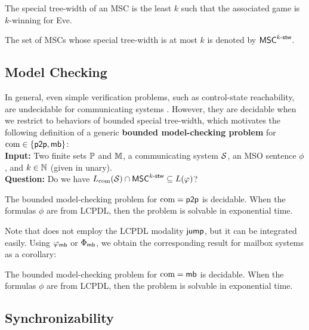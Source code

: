 \documentclass{article}
\begin{document}
\begin{fact}
	The special tree-width of an MSC is the least $k$ such that
	the associated game is $k$-winning for Eve.
\end{fact}

The set of MSCs whose special tree-width is at most $k$ is denoted by $\mathsf{MSC}^{k\textup{-}\mathsf{stw}}$.

\subsection{Model Checking}

In general, even simple verification problems, such
as control-state reachability, are undecidable for
communicating systems \cite{DBLP:journals/jacm/BrandZ83}.
However, they are decidable when we restrict to behaviors of
bounded special tree-width, which motivates the following
definition of a generic {\bf bounded model-checking problem} for $\textup{com} \in \{\mathsf{p2p}, \mathsf{mb}\}$:\\
%
{\bf Input:} Two finite sets $\mathbb{P}$ and $\mathbb{M}$, a communicating system $\mathcal{S}$, an MSO sentence $\phi$, and $k \in \mathbb{N}$ (given in unary).\\
%
{\bf Question:} Do we have $L_{\textup{com}}(\mathcal{S}) \cap \mathsf{MSC}^{k\textup{-}\mathsf{stw}} \subseteq L(\varphi)$?


\begin{fact}\label{p2p}
The bounded model-checking problem for $\textup{com} = \mathsf{p2p}$ is decidable.
When the formulas $\phi$ are from LCPDL, then the problem is solvable
in exponential time.
\end{fact}

Note that \cite{DBLP:journals/corr/abs-1904-06942} does not employ
the LCPDL modality $\textsf{jump}$, but it can be integrated easily.
Using $\varphi_{\mathsf{mb}}$ or $\Phi_{\mathsf{mb}}$, we obtain the corresponding result
for mailbox systems as a corollary:

\begin{theorem}
\label{thm:mailbox_bounded_model_checking}
The bounded model-checking problem for $\textup{com} =  \mathsf{mb}$ is decidable.
When the formulas $\phi$ are from LCPDL, then the problem is solvable
in exponential time.
\end{theorem}

\subsection{Synchronizability}
\end{document}
